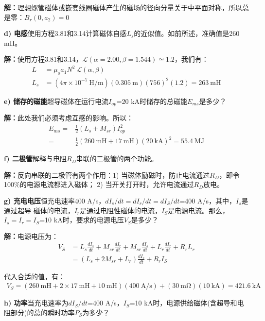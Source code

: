 \textbf{解：}理想螺管磁体或嵌套线圈磁体产生的磁场的径向分量关于中平面对称，所以总是零：$B_r(0,a_2)=0$

\textbf{d) 电感}\qquad 使用方程3.81和3.14计算磁体自感$L_s$的近似值。如前所述，准确值是260 mH。

\textbf{解：}使用方程3.81和3.14，$\mathcal{L}(\alpha=2.00,\beta=1.544)\simeq 1.2$，我们有：
\begin{align*}%
L&=\mu_oa_1N^2\ \mathcal{L}(\alpha,\beta) \\\tag{3.81}
L_s&=(4\pi\times10^{-7}\ \mathrm{H/m})(0.305\ \mathrm{m})(756)^2(1.2)=263\ \mathrm{mH}
\end{align*}

\textbf{e) 储存的磁能}\qquad 超导磁体在运行电流$I_{op}$=20 kA时储存的总磁能$E_{ms}$是多少？

\textbf{解：}此处我们必须考虑互感的影响。所以：
\begin{align*}%
E_{ms}=&\frac{1}{2}(L_s+M_{sr})I_{op}^2\\
=&\frac{1}{2}(260\ \mathrm{mH}+17\ \mathrm{mH})(20\ \mathrm{kA})^2=55.4\ \mathrm{MJ}
\end{align*}

\textbf{f) 二极管}\qquad 解释与电阻$R_D$串联的二极管的两个功能。

\textbf{解：}反向串联的二极管有两个作用：1) 当磁体励磁时，防止电流通过$R_D$，即令100\%的电源电流都进入磁体；
2) 当开关打开时，允许电流通过$R_D$放电。

\textbf{g) 充电电压}\qquad 恒充电速率400 A/s，$dI_s/dt=dI_r/dt=dI_S/dt$=400 A/s，其中，$I_s$是通过超导
磁体的电流，$I_r$是通过电阻性磁体的电流，$I_S$是电源电流。那么，$I_s=I_r=I_S$=10 kA时，要求的电源电压$V_S$是多少？

\textbf{解：}电源电压为：
\begin{align*}%
V_S&=L_s\frac{dI_s}{dt}+M_{sr}\frac{dI_r}{dt}+M_{sr}\frac{dI_s}{dt}+L_r\frac{dI_r}{dt}+R_rL_r\\
&=(L_s+2M_{sr}+L_r)\frac{dI_s}{dt}+R_rI_S \tag{g.1}
\end{align*}

代入合适的值，有：
\begin{align*}%
V_S=(260\ \mathrm{mH}+2\times17\ \mathrm{mH}+10\ \mathrm{mH})(400\ \mathrm{A/s})+(30\ \mathrm{m\Omega})(10\ \mathrm{kA})=421.6\ \mathrm{kA}
\end{align*}

\textbf{h) 功率}\qquad 当充电速率为$dI_S/dt$=400 A/s，$I_S$=10 kA时，电源供给磁体(含超导和电阻部分)的总的瞬时功率$P_S$为多少？

